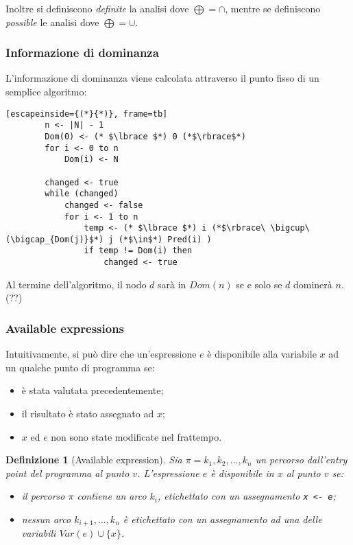 \documentclass[a4paper, 10pt]{article}
\newtheorem{definit}{Definizione}[subsection]
\begin{document}
	Inoltre si definiscono \textit{definite} la analisi dove $\bigoplus = \cap$, mentre se definiscono \textit{possible} le analisi dove $\bigoplus = \cup$.
	
	\subsubsection{Informazione di dominanza}
	L'informazione di dominanza viene calcolata attraverso il punto fisso di un semplice algoritmo: \begin{lstlisting}[escapeinside={(*}{*)}, frame=tb]
		n <- |N| - 1
		Dom(0) <- (* $\lbrace $*) 0 (*$\rbrace$*)
		for i <- 0 to n
			Dom(i) <- N
			
		changed <- true
		while (changed)
			changed <- false
			for i <- 1 to n
				temp <- (* $\lbrace $*) i (*$\rbrace\ \bigcup\ (\bigcap_{Dom(j)}$*) j (*$\in$*) Pred(i) )
				if temp != Dom(i) then
					changed <- true
	\end{lstlisting}
	
	Al termine dell'algoritmo, il nodo $d$ sarà in $Dom(n)$ se e solo se $d$ dominerà $n$. (??)
	
	\subsubsection{Available expressions}
	Intuitivamente, si può dire che un'espressione $e$ è disponibile alla variabile $x$ ad un qualche punto di programma se: \begin{itemize}
		\item è stata valutata precedentemente;
		\item il risultato è stato assegnato ad $x$;
		\item $x$ ed $e$ non sono state modificate nel frattempo.
	\end{itemize}
	
	\begin{definit}[Available expression]
		Sia $\pi = k_1,k_2, \dots, k_n$ un percorso dall'entry point del programma al punto $v$. L'espressione $e$ è disponibile in $x$ al punto $v$ se: \begin{itemize}
			\item il percorso $\pi$ contiene un arco $k_i$, etichettato con un assegnamento \lstinline|x <- e|;
			\item nessun arco $k_{i+1}, \dots, k_n$ è etichettato con un assegnamento ad una delle variabili $Var(e) \cup \lbrace x \rbrace$.
		\end{itemize}
	\end{definit}
	
\end{document}
